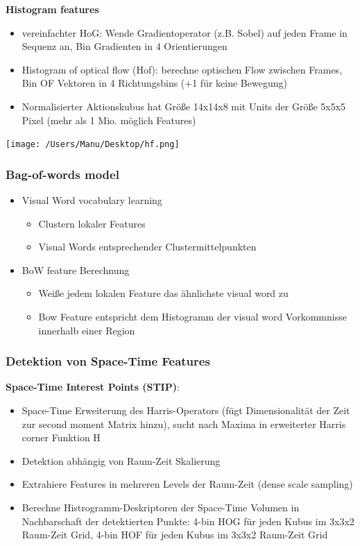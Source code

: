 \documentclass[paper=a4, fontsize=11pt]{scrartcl} %
\numberwithin{equation}{section} %
\numberwithin{figure}{section} %
\numberwithin{table}{section} %
\begin{document}
\textbf{Histogram features}

\begin{itemize}
\item vereinfachter HoG: Wende Gradientoperator (z.B. Sobel) auf jeden Frame in Sequenz an, Bin Gradienten in 4 Orientierungen
\item Histogram of optical flow (Hof): berechne optischen Flow zwischen Frames, Bin OF Vektoren in 4 Richtungsbins (+1 für keine Bewegung)
\item Normalisierter Aktionskubus hat Größe 14x14x8 mit Units der Größe 5x5x5 Pixel (mehr als 1 Mio. möglich Features)
\end{itemize}

\texttt{[image: /Users/Manu/Desktop/hf.png]}

\subsubsection{Bag-of-words model}

\begin{itemize}
\item Visual Word vocabulary learning
\begin{itemize}
\item Clustern lokaler Features
\item Visual Words entsprechender Clustermittelpunkten
\end{itemize}
\item BoW feature Berechnung
\begin{itemize}
\item Weiße jedem lokalen Feature das ähnlichste visual word zu
\item Bow Feature entspricht dem Histogramm der visual word Vorkommnisse innerhalb einer Region
\end{itemize}
\end{itemize}

\subsubsection{Detektion von Space-Time Features}

\textbf{Space-Time Interest Points (STIP)}: 

\begin{itemize}
\item Space-Time Erweiterung des Harris-Operators (fügt Dimensionalität der Zeit zur second moment Matrix hinzu), sucht nach Maxima in erweiterter Harris corner Funktion H
\item Detektion abhängig von Raum-Zeit Skalierung
\item Extrahiere Features in mehreren Levels der Raum-Zeit (dense scale sampling)
\item Berechne Histrogramm-Deskriptoren der Space-Time Volumen in Nachbarschaft der detektierten Punkte: 4-bin HOG für jeden Kubus im 3x3x2 Raum-Zeit Grid, 4-bin HOF für jeden Kubus im 3x3x2 Raum-Zeit Grid
\end{itemize}
\end{document}
